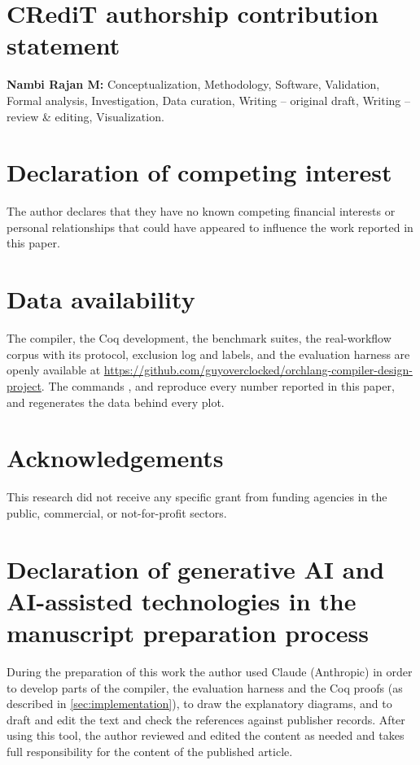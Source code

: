 
\section*{CRediT authorship contribution statement}

\textbf{Nambi Rajan M:} Conceptualization, Methodology, Software, Validation, Formal
analysis, Investigation, Data curation, Writing -- original draft, Writing -- review \&
editing, Visualization.

\section*{Declaration of competing interest}

The author declares that they have no known competing financial interests or personal
relationships that could have appeared to influence the work reported in this paper.

\section*{Data availability}

The compiler, the Coq development, the benchmark suites, the real-workflow corpus with
its protocol, exclusion log and labels, and the evaluation harness are openly available at
\url{https://github.com/guyoverclocked/orchlang-compiler-design-project}. The commands
,  and  reproduce every
number reported in this paper, and  regenerates the
data behind every plot.

\section*{Acknowledgements}

This research did not receive any specific grant from funding agencies in the public,
commercial, or not-for-profit sectors.

\section*{Declaration of generative AI and AI-assisted technologies in the manuscript preparation process}

During the preparation of this work the author used Claude (Anthropic) in order to
develop parts of the compiler, the evaluation harness and the Coq proofs (as described in
\cref{sec:implementation}), to draw the explanatory diagrams, and to draft and edit the
text and check the references against publisher records. After using this tool, the
author reviewed and edited the content as needed and takes full responsibility for the
content of the published article.
